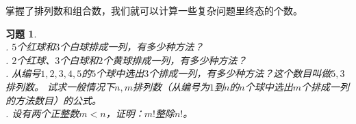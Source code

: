 \documentclass[12pt,UTF8]{ctexbook}
\newtheorem{ex}{例子}[section]
\newtheorem{xt}{习题}[section]
\begin{document}
掌握了排列数和组合数，我们就可以计算一些复杂问题里终态的个数。

\begin{xt}
    \mbox{} \\
    . $5$个红球和$3$个白球排成一列，有多少种方法？\\
    . $2$个红球、$3$个白球和$2$个黄球排成一列，有多少种方法？\\
    . 从编号$1,2,3,4,5$的$5$个球中选出$3$个排成一列，有多少种方法？这个数目叫做$5,3$排列数。
    试求一般情况下$n,m$排列数（从编号为$1$到$n$的$n$个球中选出$m$个排成一列的方法数目）的公式。\\
    . 设有两个正整数$m < n$，证明：$m!$整除$n!$。
\end{xt}

\end{document}
